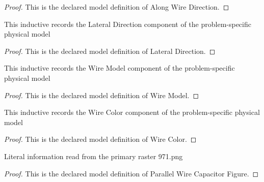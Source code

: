 \begin{proof}
  This is the declared model definition of Along Wire Direction.
\end{proof}
\begin{definition}
  \label{def:physics:phyx-mini-0971:phyxminiproblems-problemphyxmini0971-lateraldirection}
  This inductive records the Lateral Direction component of the problem-specific physical model
\end{definition}
\begin{proof}
  This is the declared model definition of Lateral Direction.
\end{proof}
\begin{definition}
  \label{def:physics:phyx-mini-0971:phyxminiproblems-problemphyxmini0971-wiremodel}
  This inductive records the Wire Model component of the problem-specific physical model
\end{definition}
\begin{proof}
  This is the declared model definition of Wire Model.
\end{proof}
\begin{definition}
  \label{def:physics:phyx-mini-0971:phyxminiproblems-problemphyxmini0971-wirecolor}
  This inductive records the Wire Color component of the problem-specific physical model
\end{definition}
\begin{proof}
  This is the declared model definition of Wire Color.
\end{proof}
\begin{definition}
  \label{def:physics:phyx-mini-0971:phyxminiproblems-problemphyxmini0971-parallelwirecapacitorfigure}
  Literal information read from the primary raster 971.png
\end{definition}
\begin{proof}
  This is the declared model definition of Parallel Wire Capacitor Figure.
\end{proof}
